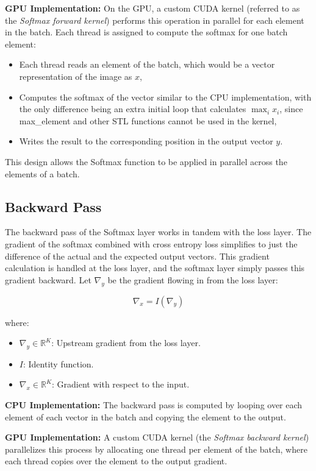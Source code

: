 \textbf{GPU Implementation:}
On the GPU, a custom CUDA kernel (referred to as the \textit{Softmax forward kernel}) performs this operation in parallel for each element in the batch. Each thread is assigned to compute the softmax for one batch element:

\begin{itemize}
    \item Each thread reads an element of the batch, which would be a vector representation of the image as \( x \),
    \item Computes the softmax of the vector similar to the CPU implementation, with the only difference being an extra initial loop that calculates $\max_i x_i$, since max\_element and other STL functions cannot be used in the kernel,
    \item Writes the result to the corresponding position in the output vector \( y \).
\end{itemize}

This design allows the Softmax function to be applied in parallel across the elements of a batch.

\subsection{Backward Pass}

The backward pass of the Softmax layer works in tandem with the loss layer. The gradient of the softmax combined with cross entropy loss simplifies to just the difference of the actual and the expected output vectors. This gradient calculation is handled at the loss layer, and the softmax layer simply passes this gradient backward. Let \( \nabla_y \) be the gradient flowing in from the loss layer:

\[
    \nabla_x = I(\nabla_y)
\]

where:
\begin{itemize}
    \item \( \nabla_y \in \mathbb{R}^{K} \): Upstream gradient from the loss layer.
    \item \( I \): Identity function.
    \item \( \nabla_x \in \mathbb{R}^{K} \): Gradient with respect to the input.
\end{itemize}

\textbf{CPU Implementation:}
The backward pass is computed by looping over each element of each vector in the batch and copying the element to the output.

\textbf{GPU Implementation:}
A custom CUDA kernel (the \textit{Softmax backward kernel}) parallelizes this process by allocating one thread per element of the batch, where each thread copies over the element to the output gradient.

